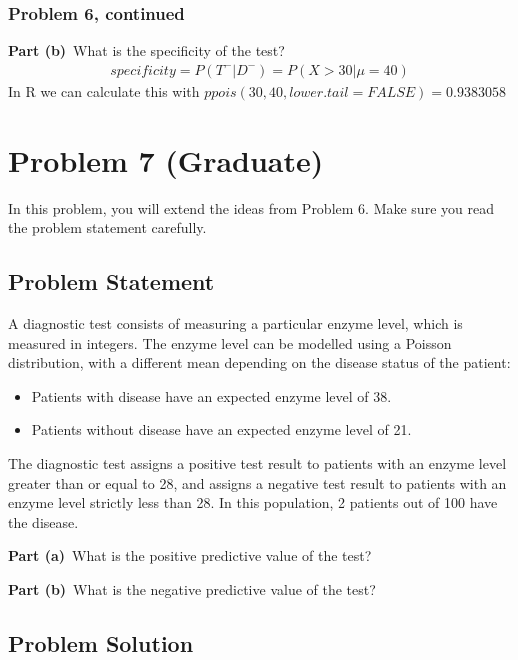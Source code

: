 \documentclass[12pt]{article}
\theoremstyle{definition}
\begin{document}
\newpage
\subsubsection*{Problem 6, continued}

\vspace{1.5in}
\noindent
{\bf Part (b)}\ What is the specificity of the test?
\begin{align*}
specificity = P(T^-|D^-) = P(X > 30|\mu = 40)
\end{align*}
In R we can calculate this with $ppois(30, 40, lower.tail = FALSE) = 0.9383058$


\newpage
\section*{Problem 7 (Graduate)}

In this problem, you will extend the ideas from Problem 6. Make sure you read the problem statement carefully.

\subsection*{Problem Statement}

A diagnostic test consists of measuring a particular enzyme level, which is measured in integers. The enzyme level can be modelled using a Poisson distribution, with a different mean depending on the disease status of the patient:
\begin{itemize}
	\item Patients with disease have an expected enzyme level of 38.
	\item Patients without disease have an expected enzyme level of 21.
\end{itemize}
The diagnostic test assigns a positive test result to patients with an enzyme level greater than or equal to 28, and assigns a negative test result to patients with an enzyme level strictly less than 28. In this population, 2 patients out of 100 have the disease.

\bigskip
\noindent
{\bf Part (a)}\ What is the positive predictive value of the test?

\bigskip
\noindent
{\bf Part (b)}\ What is the negative predictive value of the test?

\subsection*{Problem Solution}
\end{document}
